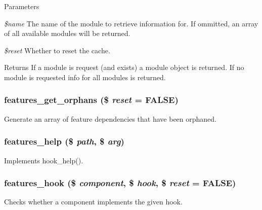 \begin{DoxyParams}{Parameters}
\item[{\em \$name}]The name of the module to retrieve information for. If ommitted, an array of all available modules will be returned. \item[{\em \$reset}]Whether to reset the cache.\end{DoxyParams}
\begin{DoxyReturn}{Returns}
If a module is request (and exists) a module object is returned. If no module is requested info for all modules is returned. 
\end{DoxyReturn}
\hypertarget{features_8module_a6aae9f9ebb34fabfe11ae61284dde230}{
\subsubsection[{features\_\-get\_\-orphans}]{\setlength{\rightskip}{0pt plus 5cm}features\_\-get\_\-orphans (\$ {\em reset} = {\ttfamily FALSE})}}
\label{features_8module_a6aae9f9ebb34fabfe11ae61284dde230}
Generate an array of feature dependencies that have been orphaned. \hypertarget{features_8module_abc18f3557bf3118b00e725fe283259ab}{
\subsubsection[{features\_\-help}]{\setlength{\rightskip}{0pt plus 5cm}features\_\-help (\$ {\em path}, \/  \$ {\em arg})}}
\label{features_8module_abc18f3557bf3118b00e725fe283259ab}
Implements hook\_\-help(). \hypertarget{features_8module_aaa5a723655f52c16385d78d0f5997c23}{
\subsubsection[{features\_\-hook}]{\setlength{\rightskip}{0pt plus 5cm}features\_\-hook (\$ {\em component}, \/  \$ {\em hook}, \/  \$ {\em reset} = {\ttfamily FALSE})}}
\label{features_8module_aaa5a723655f52c16385d78d0f5997c23}
Checks whether a component implements the given hook.

